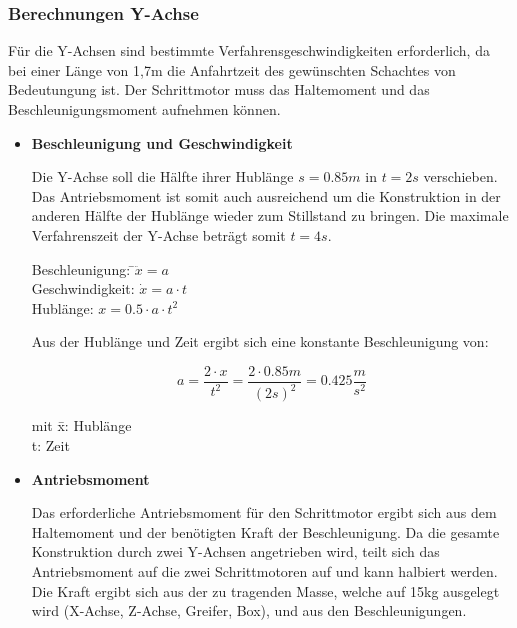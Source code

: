 \documentclass{scrartcl}
\begin{document}
\subsubsection{Berechnungen Y-Achse}


Für die Y-Achsen sind bestimmte Verfahrensgeschwindigkeiten erforderlich, da bei einer Länge von 1,7m die Anfahrtzeit des 
gewünschten Schachtes von Bedeutungung ist. Der Schrittmotor muss das Haltemoment und das Beschleunigungsmoment aufnehmen können. 

\begin{itemize}

\item \textbf{Beschleunigung und Geschwindigkeit}

Die Y-Achse soll die Hälfte ihrer Hublänge $s=0.85m$ in $t=2s$ verschieben. Das Antriebsmoment ist somit auch ausreichend um die Konstruktion in der anderen Hälfte der Hublänge wieder zum Stillstand zu bringen. Die maximale Verfahrenszeit der Y-Achse beträgt somit $t=4s$.


\begin{tabbing}
Beschleunigung: \qquad \=$\ddot{x}=a$\\
Geschwindigkeit: 							\>$\dot{x}=a\cdot t$\\
Hublänge:												\>$x=0.5\cdot a\cdot t^2$\\
\end{tabbing}

Aus der Hublänge und Zeit ergibt sich eine konstante Beschleunigung von:

\[a=\dfrac{2\cdot x}{t^2}=\dfrac{2\cdot 0.85m}{(2s)^2}=0.425\dfrac{m}{s^2}\]


\begin{tabbing}
mit \=x: Hublänge\\
		\>t: Zeit\\
\end{tabbing}


\item \textbf{Antriebsmoment}


Das erforderliche Antriebsmoment für den Schrittmotor ergibt sich aus dem Haltemoment und der benötigten Kraft der Beschleunigung. Da die gesamte Konstruktion durch zwei Y-Achsen angetrieben wird, teilt sich das Antriebsmoment auf die 
zwei Schrittmotoren auf und kann halbiert werden.\\

Die Kraft ergibt sich aus der zu tragenden Masse, welche auf 15kg ausgelegt wird (X-Achse, Z-Achse, Greifer, Box),
und aus den Beschleunigungen.


\end{itemize}
\end{document}
